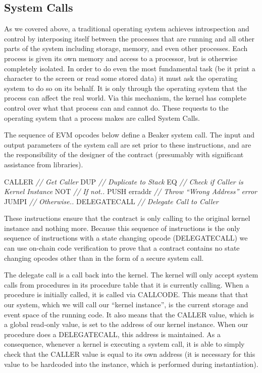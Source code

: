 \documentclass[english,a4paper]{article}
\newenvironment{Shaded}{}{}
\newcommand{\CommentTok}[1]{\textcolor[rgb]{0.38,0.63,0.69}{\textit{{#1}}}}
\newcommand{\NormalTok}[1]{{#1}}
\begin{document}
\subsection{System Calls}\label{system-calls}

As we covered above, a traditional operating system achieves
introspection and control by interposing itself between the processes
that are running and all other parts of the system including storage,
memory, and even other processes. Each process is given its own memory
and access to a processor, but is otherwise completely isolated. In
order to do even the most fundamental task (be it print a character to
the screen or read some stored data) it must ask the operating system to
do so on its behalf. It is only through the operating system that the
process can affect the real world. Via this mechanism, the kernel has
complete control over what that process can and cannot do. These
requests to the operating system that a process makes are called System
Calls.

The sequence of EVM opcodes below define a Beaker system call. The input
and output parameters of the system call are set prior to these
instructions, and are the responsibility of the designer of the contract
(presumably with significant assistance from libraries).

\begin{Shaded}
\begin{Highlighting}[]
\NormalTok{CALLER         }\CommentTok{// Get Caller}
\NormalTok{DUP            }\CommentTok{// Duplicate to Stack}
\NormalTok{EQ             }\CommentTok{// Check if Caller is Kernel Instance}
\NormalTok{NOT            }\CommentTok{// If not..}
\NormalTok{PUSH erraddr   }\CommentTok{// Throw “Wrong Address” error}
\NormalTok{JUMPI          }\CommentTok{// Otherwise..}
\NormalTok{DELEGATECALL   }\CommentTok{// Delegate Call to Caller}
\end{Highlighting}
\end{Shaded}

These instructions ensure that the contract is only calling to the
original kernel instance and nothing more. Because this sequence of
instructions is the only sequence of instructions with a state changing
opcode (DELEGATECALL) we can use on-chain code verification to prove
that a contract contains no state changing opcodes other than in the
form of a secure system call.

The delegate call is a call back into the kernel. The kernel will only
accept system calls from procedures in its procedure table that it is
currently calling. When a procedure is initially called, it is called
via CALLCODE. This means that that our system, which we will call our
``kernel instance'', is the current storage and event space of the
running code. It also means that the CALLER value, which is a global
read-only value, is set to the address of our kernel instance. When our
procedure does a DELEGATECALL, this address is maintained. As a
consequence, whenever a kernel is executing a system call, it is able to
simply check that the CALLER value is equal to its own address (it is
necessary for this value to be hardcoded into the instance, which is
performed during instantiation).
\end{document}
